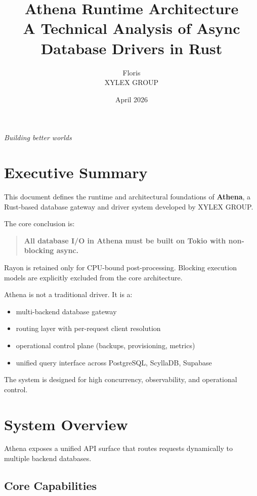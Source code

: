 \documentclass[11pt,a4paper]{article}
\title{Athena Runtime Architecture \\ \large A Technical Analysis of Async Database Drivers in Rust}
\author{Floris \\ XYLEX GROUP}
\date{April 2026}
\begin{document}
\maketitle

\begin{center}
\textit{Building better worlds}
\end{center}

\tableofcontents
\newpage

\section{Executive Summary}

This document defines the runtime and architectural foundations of \textbf{Athena}, a Rust-based database gateway and driver system developed by XYLEX GROUP.

The core conclusion is:

\begin{quote}
\textbf{All database I/O in Athena must be built on Tokio with non-blocking async.}
\end{quote}

Rayon is retained only for CPU-bound post-processing. Blocking execution models are explicitly excluded from the core architecture.

Athena is not a traditional driver. It is a:

\begin{itemize}
\item multi-backend database gateway
\item routing layer with per-request client resolution
\item operational control plane (backups, provisioning, metrics)
\item unified query interface across PostgreSQL, ScyllaDB, Supabase
\end{itemize}

The system is designed for high concurrency, observability, and operational control.

\newpage

\section{System Overview}

Athena exposes a unified API surface that routes requests dynamically to multiple backend databases.

\subsection{Core Capabilities}
\end{document}
